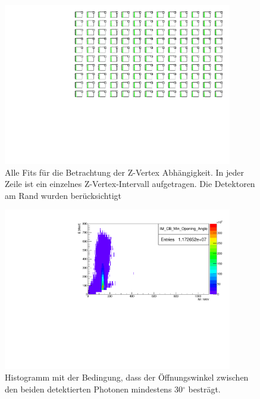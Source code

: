 \documentclass[a4paper,11pt,oneside,final,german,openbib,pdftex]{scrbook}
\begin{document}
{\begin{appendix}
\begin{figure}[h!]
	\begin{center}
		\includegraphics[width=100mm]{NewCalib/20171904ZVertexAllFits}
		\caption{Alle Fits f\"ur die Betrachtung der Z-Vertex Abh\"angigkeit. In jeder Zeile ist ein einzelnes Z-Vertex-Intervall aufgetragen. Die Detektoren am Rand wurden ber\"ucksichtigt}
		\label{fig:ZVertex-All-Fits}
	\end{center}
\end{figure}

\begin{figure}[h!]
	\begin{center}
		\includegraphics[width=100mm]{NewCalib/20171904SimMinOpeningAngleHist}
		\caption{Histogramm mit der Bedingung, dass der \"Offnungswinkel zwischen den beiden detektierten Photonen mindestens 30$^\circ$ bestr\"agt.}
	\end{center}
\end{figure}


\end{appendix}}
\end{document}
